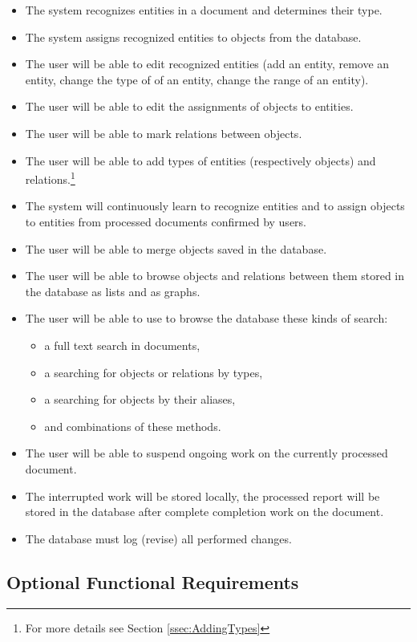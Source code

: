 \begin{itemize}
	\item The system recognizes entities in a document and determines their type.
	\item The system assigns recognized entities to objects from the database.
	\item The user will be able to edit recognized entities (add an entity,
	remove an entity, change the type of of an entity, change the range of an
	entity).
	\item The user will be able to edit the assignments of objects to entities.
	\item The user will be able to mark relations between objects.
	\item The user will be able to add types of entities (respectively objects)
	and relations.\footnote{For more details see Section \ref{ssec:AddingTypes}}
	\item The system will continuously learn to recognize entities and to assign
	objects to entities from processed documents confirmed by users.
	\item The user will be able to merge objects saved in the database.
	\item The user will be able to browse objects and relations between them
	stored in the database as lists and as graphs.
	\item The user will be able to use to browse the database these kinds of 
	search:
	\begin{itemize}
		\item a full text search in documents,
		\item a searching for objects or relations by types,
		\item a searching for objects by their aliases,
		\item and combinations of these methods.
	\end{itemize}
	\item The user will be able to suspend ongoing work on the currently
	processed document.
	\item The interrupted work will be stored locally, the processed report will
	be stored in the database after complete  completion work on the document.
	\item The database must log (revise) all performed changes.
\end{itemize}

\subsection{Optional Functional Requirements}

